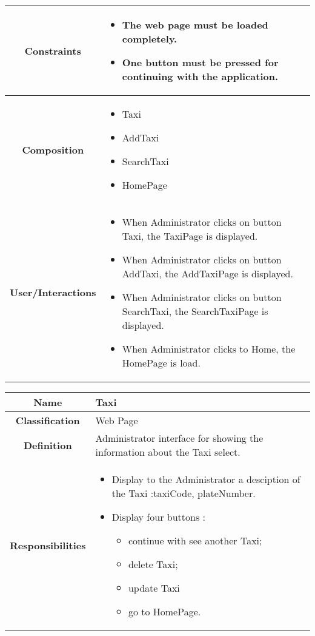 \documentclass[11pt, a4paper,titlepage]{article}
\begin{document}
\begin{enumerate}
\begin{tabularx}{\textwidth}{| c | X |}
	\\
	\hline
	\textbf{Constraints} &
	\begin{itemize}
		\item  The web page must be loaded completely.
		\item One button must be pressed for continuing with the application.
	\end{itemize}
	\\
	\hline
	\textbf{Composition} &
	\begin{itemize}
		\item Taxi
		\item AddTaxi
		\item SearchTaxi
		\item HomePage
	\end{itemize}
	\\
	\hline
	\textbf{User/Interactions} &
	\begin{itemize}
		\item When Administrator clicks on button Taxi, the TaxiPage is displayed.
		\item When Administrator clicks on button AddTaxi, the AddTaxiPage is displayed.
		\item When Administrator clicks on button SearchTaxi, the SearchTaxiPage is displayed.
		\item When Administrator clicks to Home, the HomePage is load.
	\end{itemize}
	\\
	\hline 
\end{tabularx}
\begin{tabularx}{\textwidth}{| c | X |}
	\hline
	\textbf{Name} &
	Taxi
	\\
	\hline
	\textbf{Classification} &
	Web Page
	\\
	\hline
	\textbf{Definition} &
	Administrator interface for showing the information about the Taxi select.\\
	\hline
	\textbf{Responsibilities} &
	\begin{itemize}
		\item Display to the Administrator a desciption of the Taxi :taxiCode, plateNumber.
		\item Display four buttons :
		\begin{itemize}
			\item continue with see another Taxi;
			\item delete Taxi;
			\item update Taxi
			\item go to HomePage.
		\end{itemize}

\end{itemize}
\end{tabularx}
\end{enumerate}
\end{document}
